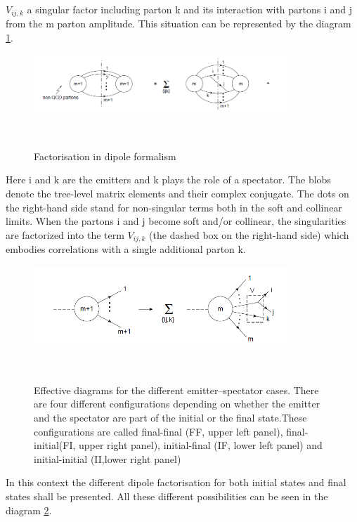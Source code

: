 $ V_{ij,k} $ a singular factor including parton k and its interaction with partons i and j from the m parton amplitude. This situation can be represented by the diagram \ref{factorisationPic}.

\begin{figure}[h!]
\centering
\includegraphics[width=0.85\textwidth]{images/Intro/factorisationPic.png}
\caption{Factorisation in dipole formalism}
\label{factorisationPic}
~\cite{Catani:1996vz}
\end{figure}

Here i and k are the emitters and k plays the role of a spectator. The blobs denote the tree-level matrix elements and their complex conjugate. The dots on the right-hand side stand for non-singular terms both in the soft and collinear limits.
When the partons i and j become soft and/or collinear, the singularities are factorized into the term $ V_{ij,k} $ (the
dashed box on the right-hand side) which embodies correlations with a single additional parton k.

\begin{figure}[h!]
\centering
\includegraphics[width=0.85\textwidth]{images/Intro/factorisationPic2.png}
\caption{Effective diagrams for the different emitter–spectator cases. There  are  four  different  configurations  depending  on whether the emitter and the spectator are part of the initial or the final state.These configurations are called final-final (FF, upper left panel), final-initial(FI, upper right panel), initial-final (IF, lower left panel) and initial-initial (II,lower right panel)}
\label{factorisationPic2}
~\cite{Catani:2002hc}
\end{figure}

In this context the different dipole factorisation for both initial states and final states shall be presented. All these different possibilities can be seen in the diagram \ref{factorisationPic2}.

